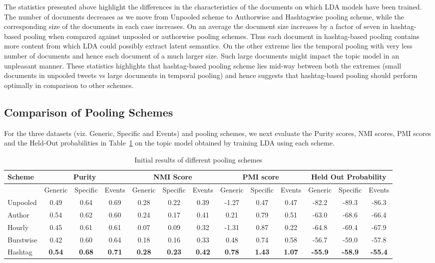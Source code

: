 \documentclass[10pt,a5paper,twoside]{article}
\begin{document}
The statistics presented above highlight the differences in the
characteristics of the documents on which LDA models have been
trained. The number of documents decreases as we move from Unpooled
scheme to Authorwise and Hashtagwise pooling scheme, while the
corresponding size of the documents in each case increases. On an
average the document size increases by a factor of seven in hashtag-based
pooling when compared against unpooled or authorwise pooling
schemes. Thus each document in hashtag-based pooling contains more
content from which LDA could possibly extract latent semantics. On the
other extreme lies the temporal pooling with very less number of
documents and hence each document of a much larger size. Such large
documents might impact the topic model in an unpleasant manner. These
statistics highlights that hashtag-based pooling scheme lies mid-way
between both the extremes (small documents in unpooled tweets vs large
documents in temporal pooling) and hence suggests that hashtag-based
pooling should perform optimally in comparison to other schemes.

\subsection{Comparison of Pooling Schemes}

For the three datasets (viz. Generic, Specific and Events) and pooling
schemes, we next evaluate the Purity scores, NMI scores, PMI scores and the Held-Out probabilities
in Table~\ref{tbl-456} on the topic model obtained by training LDA
using each scheme.

\begin{table}[!h]
\centering
\resizebox{14cm}{!} 
{
	\begin{tabular}{|l|ccc|ccc|ccc|ccc|}
	\hline
	Scheme  & \multicolumn {3}{c|}{Purity} & \multicolumn {3}{c|}{NMI Score} & \multicolumn {3}{c|}{PMI score} & \multicolumn {3}{c|}{Held Out Probability}\\
	\hline
	 & Generic & Specific & Events &  Generic & Specific & Events &  Generic & Specific & Events & Generic & Specific & Events\\
	\hline
	Unpooled & 0.49 & 0.64 & 0.69 & 0.28 & 0.22 & 0.39 & -1.27 & 0.47 & 0.47 & -82.2 & -89.3 & -86.3\\
	\hline
	Author & 0.54 & 0.62 & 0.60 & 0.24 & 0.17 & 0.41 & 0.21 & 0.79 & 0.51 &-63.0 & -68.6 & -66.4\\
	\hline
	Hourly & 0.45 & 0.61 & 0.61 & 0.07 & 0.09 & 0.32 & -1.31 & 0.87 & 0.22 & -64.8 & -69.4 & -67.9\\
	\hline
	Burstwise & 0.42 & 0.60 & 0.64 & 0.18 & 0.16 & 0.33 & 0.48 & 0.74 & 0.58 & -56.7 & -59.0 & -57.8\\
	\hline
	Hashtag & \textbf{0.54} & \textbf{0.68} & \textbf{0.71} & \textbf{0.28} & \textbf{0.23} & \textbf{0.42} & \textbf{0.78} & \textbf{1.43} & \textbf{1.07} & \textbf{-55.9} & \textbf{-58.9} & \textbf{-55.4}\\
	\hline
	\end{tabular}
}
\caption{Initial results of different pooling schemes}\label{tbl-456}
\end{table}
\end{document}
